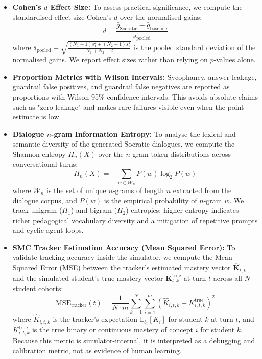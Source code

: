 \documentclass[11pt,a4paper]{report}
\begin{document}
\begin{itemize}
    \item \textbf{Cohen's $d$ Effect Size:} To assess practical significance, we compute the standardised effect size Cohen's $d$ over the normalised gains:
    \begin{equation}
        d = \frac{\bar{g}_{\text{Socratic}} - \bar{g}_{\text{baseline}}}{s_{\text{pooled}}}
    \end{equation}
    where $s_{\text{pooled}} = \sqrt{\frac{(N_1-1)s_1^2 + (N_2-1)s_2^2}{N_1 + N_2 - 2}}$ is the pooled standard deviation of the normalised gains. We report effect sizes rather than relying on $p$-values alone.
    \item \textbf{Proportion Metrics with Wilson Intervals:} Sycophancy, answer leakage, guardrail false positives, and guardrail false negatives are reported as proportions with Wilson 95\% confidence intervals. This avoids absolute claims such as "zero leakage" and makes rare failures visible even when the point estimate is low.
    \item \textbf{Dialogue $n$-gram Information Entropy:} To analyse the lexical and semantic diversity of the generated Socratic dialogues, we compute the Shannon entropy $H_n(X)$ over the $n$-gram token distributions across conversational turns:
    \begin{equation}
        H_n(X) = -\sum_{w \in \mathcal{W}_n} P(w) \log_2 P(w)
    \end{equation}
    where $\mathcal{W}_n$ is the set of unique $n$-grams of length $n$ extracted from the dialogue corpus, and $P(w)$ is the empirical probability of $n$-gram $w$. We track unigram ($H_1$) and bigram ($H_2$) entropies; higher entropy indicates richer pedagogical vocabulary diversity and a mitigation of repetitive prompts and cyclic agent loops.
    \item \textbf{SMC Tracker Estimation Accuracy (Mean Squared Error):} To validate tracking accuracy inside the simulator, we compute the Mean Squared Error (MSE) between the tracker's estimated mastery vector $\hat{\mathbf{K}}_{t, k}$ and the simulated student's true mastery vector $\mathbf{K}^{\text{true}}_{t, k}$ at turn $t$ across all $N$ student cohorts:
    \begin{equation}
        \text{MSE}_{\text{tracker}}(t) = \frac{1}{N \cdot m} \sum_{k=1}^N \sum_{i=1}^m \left( \hat{K}_{i, t, k} - K^{\text{true}}_{i, t, k} \right)^2
    \end{equation}
    where $\hat{K}_{i, t, k}$ is the tracker's expectation $\mathbb{E}_{b_t}[K_i]$ for student $k$ at turn $t$, and $K^{\text{true}}_{i, t, k}$ is the true binary or continuous mastery of concept $i$ for student $k$. Because this metric is simulator-internal, it is interpreted as a debugging and calibration metric, not as evidence of human learning.
\end{itemize}
\end{document}
